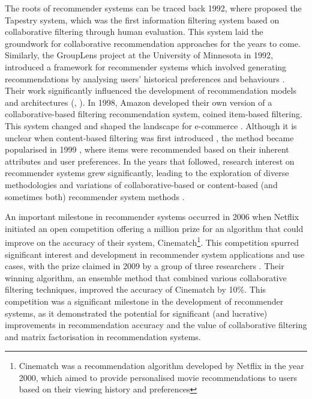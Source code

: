 The roots of recommender systems can be traced back 1992, where \cite{goldberg1992using} proposed the Tapestry system, which was the first information filtering system based on collaborative filtering through human evaluation. This system laid the groundwork for collaborative recommendation approaches for the years to come. Similarly, the GroupLens project at the University of Minnesota in 1992, introduced a framework for recommender systems which involved generating recommendations by analysing users' historical preferences and behaviours \cite{konstan1997grouplens}. Their work significantly influenced the development of recommendation models and architectures (\cite{konstan1997grouplens}, \cite{huang2004applying}). In 1998, Amazon developed their own version of a collaborative-based filtering recommendation system, coined item-based filtering. This system changed and shaped the landscape for e-commerce \cite{linden2003amazon}. Although it is unclear when content-based filtering was first introduced \cite{balabanovic1997fab}, the method became popularised in 1999 \cite{herlocker1999algorithmic}, where items were recommended based on their inherent attributes and user preferences. In the years that followed, research interest on recommender systems grew significantly, leading to the exploration of diverse methodologies and variations of collaborative-based or content-based (and sometimes both) recommender system methods \cite{burke2002hybrid}. 

An important milestone in recommender systems occurred in 2006 when Netflix initiated an open competition offering a  million prize for an algorithm that could improve on the accuracy of their system, Cinematch\footnote{Cinematch was a recommendation algorithm developed by Netflix in the year 2000, which aimed to provide personalised movie recommendations to users based on their viewing history and preferences}. This competition spurred significant interest and development in recommender system applications and use cases, with the prize claimed in 2009 by a group of three researchers \cite{bennett2007netflix}. Their winning algorithm, an ensemble method that combined various collaborative filtering techniques, improved the accuracy of Cinematch by 10\%. This competition was a significant milestone in the development of recommender systems, as it demonstrated the potential for significant (and lucrative) improvements in recommendation accuracy and the value of collaborative filtering and matrix factorisation in recommendation systems.

